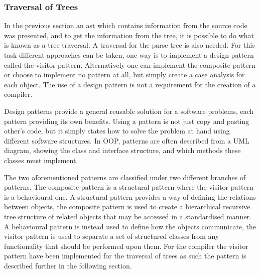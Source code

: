 \subsubsection*{Traversal of Trees}
In the previous section an \acrshort{ast} which contains information from the source code was presented, and to get the information from the tree, it is possible to do what is known as a tree traversal.
A traversal for the parse tree is also needed.
For this task different approaches can be taken, one way is to implement a design pattern called the visitor pattern.
Alternatively one can implement the composite pattern or choose to implement no pattern at all, but simply create a case analysis for each object.
The use of a design pattern is not a requirement for the creation of a compiler.

Design patterns provide a general reusable solution for a software problems, each pattern providing its own benefits.
Using a pattern is not just copy and pasting other's code, but it simply states how to solve the problem at hand using different software structures.
In OOP, patterns are often described from a UML diagram, showing the class and interface structure, and which methods these classes must implement. 

The two aforementioned patterns are classified under two different branches of patterns.
The composite pattern is a structural pattern where the visitor pattern is a behavioural one.
A structural pattern provides a way of defining the relations between objects, the composite pattern is used to create a hierarchical recursive tree structure of related objects that may be accessed in a standardised manner.
A behavioural pattern is instead used to define how the objects communicate, the visitor pattern is used to separate a set of structured classes from any functionality that should be performed upon them.
For the compiler the visitor pattern have been implemented for the traversal of trees as such the pattern is described further in the following section. 
